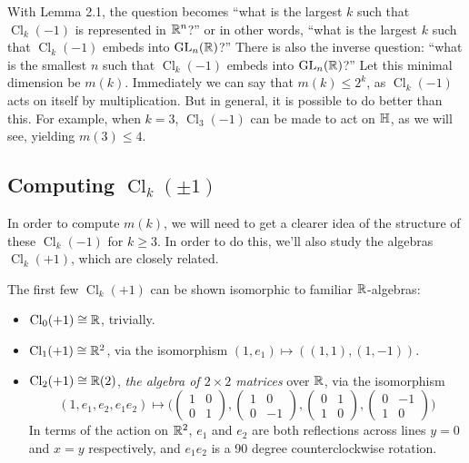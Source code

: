 \documentclass{amsart}
\DeclareMathOperator{\Cl}{\mathrm{Cl}}
\begin{document}
	With Lemma 2.1, the question becomes ``what is the largest $k$ such that $\Cl_k(-1)$ is represented in $\mathbb{R}^n$?'' or in other words, ``what is the largest $k$ such that $\Cl_k(-1)$ embeds into $\operatorname{GL}_n(\mathbb{R})$?'' There is also the inverse question: ``what is the smallest $n$ such that $\Cl_k(-1)$ embeds into $\operatorname{GL}_n(\mathbb{R})$?'' Let this minimal dimension be $m(k)$. Immediately we can say that $m(k)\leq 2^k$, as $\Cl_k(-1)$ acts on itself by multiplication. But in general, it is possible to do better than this. For example, when $k=3$, $\Cl_3(-1)$ can be made to act on $\mathbb{H}$, as we will see, yielding $m(3)\leq 4$.\\
	
	
	
	\subsection{Computing $\Cl_k(\pm 1)$}
	In order to compute $m(k)$, we will need to get a clearer idea of the structure of these $\Cl_k(-1)$ for $k\geq 3$. In order to do this, we'll also study the algebras $\Cl_k(+1)$, which are closely related.
	
	The first few $\Cl_k(+1)$ can be shown isomorphic to familiar $\mathbb{R}$-algebras:
	\begin{itemize}
		\item $\Cl_0(+1)\cong \R$, trivially.
		\item $\Cl_1(+1)\cong \R^2$, via the isomorphism $(1,e_1)\mapsto ((1,1),(1,-1))$.
		\item $\Cl_2(+1)\cong \R(2)$, \textit{the algebra of $2\times 2$ matrices} over $\mathbb{R}$, via the isomorphism
		$$
		(1,e_1,e_2,e_1e_2) \mapsto \Bigg(
		\begin{pmatrix}
			1 & 0\\
			0 & 1
		\end{pmatrix}, 
		\begin{pmatrix}
			1 & 0\\
			0 & -1
		\end{pmatrix}, 
		\begin{pmatrix}
			0 & 1\\
			1 & 0
		\end{pmatrix}, 
		\begin{pmatrix}
			0 & -1\\
			1 & 0
		\end{pmatrix}\Bigg)
		$$
		In terms of the action on $\mathbb{R}^2$, $e_1$ and $e_2$ are both reflections across lines $y=0$ and $x=y$ respectively, and $e_1e_2$ is a 90 degree counterclockwise rotation.\\
	\end{itemize}
	
\end{document}
